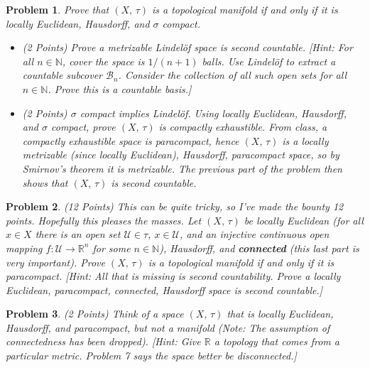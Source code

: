 \documentclass{article}
\theoremstyle{normal}
\newtheorem{problem}{Problem}
\begin{document}
    \begin{problem}
        Prove that $(X,\,\tau)$ is a topological manifold if and only if
        it is locally Euclidean, Hausdorff, and $\sigma$ compact.
        \begin{itemize}
            \item (2 Points) Prove a metrizable Lindel\"{o}f space is
                second countable. [Hint: For all $n\in\mathbb{N}$, cover the
                space is $1/(n+1)$ balls. Use Lindel\"{o}f to extract a
                countable subcover $\mathcal{B}_{n}$. Consider the collection
                of all such open sets for all $n\in\mathbb{N}$. Prove this is
                a countable basis.]
            \item (2 Points) $\sigma$ compact implies Lindel\"{o}f. Using
                locally Euclidean, Hausdorff, and $\sigma$ compact, prove
                $(X,\,\tau)$ is compactly exhaustible. From class, a
                compactly exhaustible space is paracompact, hence
                $(X,\,\tau)$ is a locally metrizable (since locally Euclidean),
                Hausdorff, paracompact space, so by Smirnov's theorem it is
                metrizable. The previous part of the problem then shows that
                $(X,\,\tau)$ is second countable.
        \end{itemize}
    \end{problem}
    \begin{problem}
        (12 Points) This can be quite tricky, so I've made the bounty 12 points.
        Hopefully this pleases the masses. Let $(X,\,\tau)$ be locally
        Euclidean (for all $x\in{X}$ there is an open set
        $\mathcal{U}\in\tau$, $x\in\mathcal{U}$, and an injective continuous
        open mapping $f:\mathcal{U}\rightarrow\mathbb{R}^{n}$
        for some $n\in\mathbb{N}$), Hausdorff, and \textbf{connected}
        (this last part is very important). Prove $(X,\,\tau)$ is a
        topological manifold if and only if it is paracompact.
        [Hint: All that is missing is second countability. Prove a
        locally Euclidean, paracompact, connected, Hausdorff space is second
        countable.]
    \end{problem}
    \begin{problem}
        (2 Points) Think of a space $(X,\,\tau)$ that is locally Euclidean,
        Hausdorff, and paracompact, but not a manifold
        (Note: The assumption of connectedness has been dropped).
        [Hint: Give $\mathbb{R}$ a topology that comes from a
        particular metric. Problem 7 says the space better be disconnected.]
    \end{problem}
\end{document}
